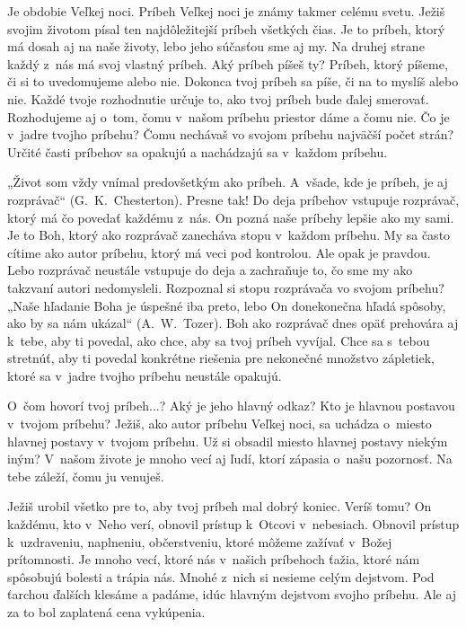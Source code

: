 \def\velkostpisma{10}
\def\velkostriadku{12.5}



Je obdobie Veľkej noci. Príbeh Veľkej noci je známy takmer celému svetu. Ježiš svojim životom písal ten najdôležitejší príbeh všetkých čias. Je to príbeh, ktorý má dosah aj na naše životy, lebo jeho súčasťou sme aj my. Na druhej strane každý z~nás má svoj vlastný príbeh. Aký príbeh píšeš ty? Príbeh, ktorý píšeme, či si to uvedomujeme alebo nie. Dokonca tvoj príbeh sa píše, či na to myslíš alebo nie. Každé tvoje rozhodnutie určuje to, ako tvoj príbeh bude ďalej smerovať. Rozhodujeme aj o~tom, čomu v~našom príbehu priestor dáme a čomu nie.
Čo je v~jadre tvojho príbehu? Čomu nechávaš vo svojom príbehu najväčší počet strán? Určité časti príbehov sa opakujú a nachádzajú sa v~každom príbehu.

„Život som vždy vnímal predovšetkým ako príbeh. A~všade, kde je príbeh, je aj rozprávač“ (G.~K.~Chesterton). Presne tak! Do deja príbehov vstupuje rozprávač, ktorý má čo povedať každému z~nás. On pozná naše príbehy lepšie ako my sami. Je to Boh, ktorý ako rozprávač zanecháva stopu v~každom príbehu. My sa často cítime ako autor príbehu, ktorý má veci pod kontrolou. Ale opak je pravdou. Lebo rozprávač neustále vstupuje do deja a zachraňuje to, čo sme my ako takzvaní autori nedomysleli. Rozpoznal si stopu rozprávača vo svojom príbehu? „Naše hľadanie Boha je úspešné iba preto, lebo On donekonečna hľadá spôsoby, ako by sa nám ukázal“ (A.~W.~Tozer).
Boh ako rozprávač dnes opäť prehovára aj k~tebe, aby ti povedal, ako chce, aby sa tvoj príbeh vyvíjal. Chce sa s~tebou stretnúť, aby ti povedal konkrétne riešenia pre nekonečné množstvo zápletiek, ktoré sa v~jadre tvojho príbehu neustále opakujú.

O~čom hovorí tvoj príbeh...? Aký je jeho hlavný odkaz? Kto je hlavnou postavou v~tvojom príbehu? Ježiš, ako autor príbehu Veľkej noci, sa uchádza o~miesto hlavnej postavy v~tvojom príbehu. Už si obsadil miesto hlavnej postavy niekým iným? V~našom živote je mnoho vecí aj ľudí, ktorí zápasia o~našu pozornosť. Na tebe záleží, čomu ju venuješ.

Ježiš urobil všetko pre to, aby tvoj príbeh mal dobrý koniec. Veríš tomu? On každému, kto v~Neho verí, obnovil prístup k~Otcovi v~nebesiach. Obnovil prístup k~uzdraveniu, naplneniu, občerstveniu, ktoré môžeme zažívať v~Božej prítomnosti.
Je mnoho vecí, ktoré nás v~našich príbehoch ťažia, ktoré nám spôsobujú bolesti a trápia nás. Mnohé z~nich si nesieme celým dejstvom. Pod ťarchou ďalších klesáme a padáme, idúc hlavným dejstvom svojho príbehu. Ale aj za to bol zaplatená cena vykúpenia.

